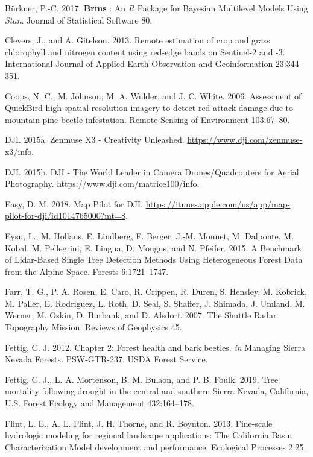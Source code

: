 \documentclass[]{article}
\begin{document}
\hypertarget{ref-burkner2017}{}
Bürkner, P.-C. 2017. \textbf{Brms} : An \emph{R} Package for Bayesian
Multilevel Models Using \emph{Stan}. Journal of Statistical Software 80.

\hypertarget{ref-clevers2013}{}
Clevers, J., and A. Gitelson. 2013. Remote estimation of crop and grass
chlorophyll and nitrogen content using red-edge bands on Sentinel-2 and
-3. International Journal of Applied Earth Observation and
Geoinformation 23:344--351.

\hypertarget{ref-coops2006}{}
Coops, N. C., M. Johnson, M. A. Wulder, and J. C. White. 2006.
Assessment of QuickBird high spatial resolution imagery to detect red
attack damage due to mountain pine beetle infestation. Remote Sensing of
Environment 103:67--80.

\hypertarget{ref-dji2015}{}
DJI. 2015a. Zenmuse X3 - Creativity Unleashed.
\url{https://www.dji.com/zenmuse-x3/info}.

\hypertarget{ref-dji2015a}{}
DJI. 2015b. DJI - The World Leader in Camera Drones/Quadcopters for
Aerial Photography. \url{https://www.dji.com/matrice100/info}.

\hypertarget{ref-dronesmadeeasy2018}{}
Easy, D. M. 2018. ‎Map Pilot for DJI.
\url{https://itunes.apple.com/us/app/map-pilot-for-dji/id1014765000?mt=8}.

\hypertarget{ref-eysn2015}{}
Eysn, L., M. Hollaus, E. Lindberg, F. Berger, J.-M. Monnet, M. Dalponte,
M. Kobal, M. Pellegrini, E. Lingua, D. Mongus, and N. Pfeifer. 2015. A
Benchmark of Lidar-Based Single Tree Detection Methods Using
Heterogeneous Forest Data from the Alpine Space. Forests 6:1721--1747.

\hypertarget{ref-farr2007}{}
Farr, T. G., P. A. Rosen, E. Caro, R. Crippen, R. Duren, S. Hensley, M.
Kobrick, M. Paller, E. Rodriguez, L. Roth, D. Seal, S. Shaffer, J.
Shimada, J. Umland, M. Werner, M. Oskin, D. Burbank, and D. Alsdorf.
2007. The Shuttle Radar Topography Mission. Reviews of Geophysics 45.

\hypertarget{ref-fettig2012b}{}
Fettig, C. J. 2012. Chapter 2: Forest health and bark beetles. \emph{in}
Managing Sierra Nevada Forests. PSW-GTR-237. USDA Forest Service.

\hypertarget{ref-fettig2019}{}
Fettig, C. J., L. A. Mortenson, B. M. Bulaon, and P. B. Foulk. 2019.
Tree mortality following drought in the central and southern Sierra
Nevada, California, U.S. Forest Ecology and Management 432:164--178.

\hypertarget{ref-flint2013}{}
Flint, L. E., A. L. Flint, J. H. Thorne, and R. Boynton. 2013.
Fine-scale hydrologic modeling for regional landscape applications: The
California Basin Characterization Model development and performance.
Ecological Processes 2:25.
\end{document}
